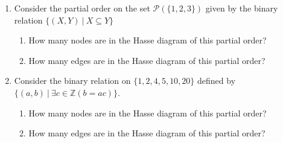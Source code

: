 
\begin{enumerate}
\item Consider the partial order on the set $\mathcal{P}(\{1,2,3\})$ given by the binary relation 
    $\{ (X,Y) ~|~X \subseteq Y \}$
    \begin{enumerate}
    \item How many nodes are in the Hasse diagram of this partial order?
    \item How many edges are in the Hasse diagram of this partial order?
    \end{enumerate}
\item Consider the binary relation on $\{1,2,4,5,10,20\}$ 
defined by $\{(a,b) ~|~ \exists c \in \mathbb{Z} ( b = ac)\}$.
    \begin{enumerate}
    \item How many nodes are in the Hasse diagram of this partial order?
    \item How many edges are in the Hasse diagram of this partial order?
    \end{enumerate}
\end{enumerate}